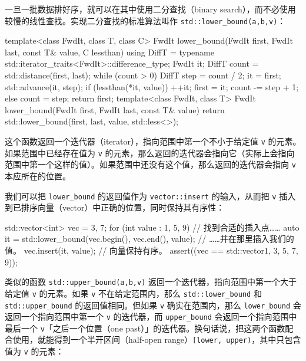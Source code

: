 一旦一批数据排好序，就可以在其中使用二分查找（binary search），而不必使用较慢的线性查找。实现二分查找的标准算法叫作 \texttt{std::\allowbreak{}lower\_\allowbreak{}bound(\allowbreak{}a,\allowbreak{}b,\allowbreak{}v)\allowbreak{}}：

\begin{codebox}[cpp]
    template<class FwdIt, class T, class C>
    FwdIt lower_bound(FwdIt first, FwdIt last, const T& value, C lessthan)
    {
      using DiffT = typename std::iterator_traits<FwdIt>::difference_type;
      FwdIt it;
      DiffT count = std::distance(first, last);
      while (count > 0) {
        DiffT step = count / 2;
        it = first;
        std::advance(it, step);
        if (lessthan(*it, value)) {
          ++it;
          first = it;
          count -= step + 1;
        } else {
          count = step;
        }
      }
      return first;
    }
    template<class FwdIt, class T>
    FwdIt lower_bound(FwdIt first, FwdIt last, const T& value)
    {
      return std::lower_bound(first, last, value, std::less<>{});
    }
\end{codebox}

这个函数返回一个迭代器（iterator），指向范围中第一个不小于给定值 \texttt{v} 的元素。如果范围中已经存在值为 \texttt{v} 的元素，那么返回的迭代器会指向它（实际上会指向范围中第一个这样的值）。如果范围中还没有这个值，那么返回的迭代器会指向 \texttt{v} 本应所在的位置。

我们可以把 \texttt{lower\_\allowbreak{}bound} 的返回值作为 \texttt{vector::\allowbreak{}insert} 的输入，从而把 \texttt{v} 插入到已排序向量（vector）中正确的位置，同时保持其有序性：

\begin{codebox}[cpp]
    std::vector<int> vec = {3, 7};
    for (int value : {1, 5, 9}) {
      // 找到合适的插入点……
      auto it = std::lower_bound(vec.begin(), vec.end(), value);
      // ……并在那里插入我们的值。
      vec.insert(it, value);
    }
    // 向量保持有序。
    assert((vec == std::vector{1, 3, 5, 7, 9}));
\end{codebox}

类似的函数 \texttt{std::\allowbreak{}upper\_\allowbreak{}bound(\allowbreak{}a,\allowbreak{}b,\allowbreak{}v)\allowbreak{}} 返回一个迭代器，指向范围中第一个大于给定值 \texttt{v} 的元素。如果 \texttt{v} 不在给定范围内，那么 \texttt{std::\allowbreak{}lower\_\allowbreak{}bound} 和 \texttt{std::\allowbreak{}upper\_\allowbreak{}bound} 的返回值相同。但如果 \texttt{v} 确实在范围内，那么 \texttt{lower\_\allowbreak{}bound} 会返回一个指向范围中第一个 \texttt{v} 的迭代器，而 \texttt{upper\_\allowbreak{}bound} 会返回一个指向范围中最后一个 \texttt{v}「之后一个位置（one past）」的迭代器。换句话说，把这两个函数配合使用，就能得到一个半开区间（half-open range）\texttt{[lower,\allowbreak{} upper)\allowbreak{}}，其中只包含值为 \texttt{v} 的元素：

